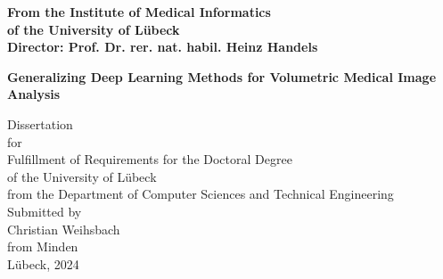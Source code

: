 \begin{titlepage}

    \addtolength{\topmargin}{-1.2cm}
    \addtolength{\textwidth}{2.35cm}

    \vspace*{-2.7cm}
    \vspace*{0.4cm}

    \begin{center}


        \enlargethispage{5cm}
        \textbf{From the Institute of Medical Informatics}\\
        \textbf{of the University of Lübeck}\\
        \textbf{Director: Prof. Dr. rer. nat. habil. Heinz Handels}\\[2.8cm]
        \begin{Large}
            \textbf{Generalizing Deep Learning Methods for Volumetric Medical Image Analysis
            }\\ %
        \end{Large}

        \vspace*{2.5cm}

        Dissertation\\
        for\\
        Fulfillment of Requirements for the Doctoral Degree\\
        of the University of Lübeck\\[1.0cm]
        from the Department of Computer Sciences and Technical Engineering\\[1.0cm]
        Submitted by\\[0.1cm]
        Christian Weihsbach\\[0.1cm]
        from Minden\\[3.0cm]
        Lübeck, 2024
        \end{center}


    \newpage
    \thispagestyle{empty}

    \addtolength{\topmargin}{1.2cm}
    \addtolength{\textwidth}{-2.35cm}
\end{titlepage}

